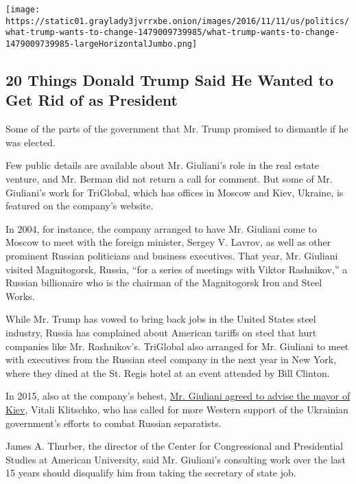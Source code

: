 \href{https://www.nytimes3xbfgragh.onion/interactive/2016/11/11/us/politics/what-trump-wants-to-change.html}{}

\texttt{[image: https://static01.graylady3jvrrxbe.onion/images/2016/11/11/us/politics/what-trump-wants-to-change-1479009739985/what-trump-wants-to-change-1479009739985-largeHorizontalJumbo.png]}

\hypertarget{20-things-donald-trump-said-he-wanted-to-get-rid-of-as-president}{%
\subsection{20 Things Donald Trump Said He Wanted to Get Rid of as
President}\label{20-things-donald-trump-said-he-wanted-to-get-rid-of-as-president}}

Some of the parts of the government that Mr. Trump promised to dismantle
if he was elected.

Few public details are available about Mr. Giuliani's role in the real
estate venture, and Mr. Berman did not return a call for comment. But
some of Mr. Giuliani's work for TriGlobal, which has offices in Moscow
and Kiev, Ukraine, is featured on the company's website.

In 2004, for instance, the company arranged to have Mr. Giuliani come to
Moscow to meet with the foreign minister, Sergey V. Lavrov, as well as
other prominent Russian politicians and business executives. That year,
Mr. Giuliani visited Magnitogorsk, Russia, ``for a series of meetings
with Viktor Rashnikov,'' a Russian billionaire who is the chairman of
the Magnitogorsk Iron and Steel Works.

While Mr. Trump has vowed to bring back jobs in the United States steel
industry, Russia has complained about American tariffs on steel that
hurt companies like Mr. Rashnikov's. TriGlobal also arranged for Mr.
Giuliani to meet with executives from the Russian steel company in the
next year in New York, where they dined at the St. Regis hotel at an
event attended by Bill Clinton.

In 2015, also at the company's behest,
\href{http://www.tgsv.net/news/may-7-2008-\%E2\%80\%93-former-mayor-new-york-rudolph-giuliani-met-vitali-klitschko-nasdaq-studio-times-sq}{Mr.
Giuliani agreed to advise the mayor of Kiev}, Vitali Klitschko, who has
called for more Western support of the Ukrainian government's efforts to
combat Russian separatists.

James A. Thurber, the director of the Center for Congressional and
Presidential Studies at American University, said Mr. Giuliani's
consulting work over the last 15 years should disqualify him from taking
the secretary of state job.


